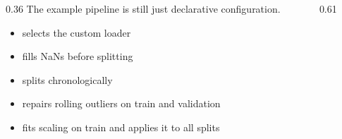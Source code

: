 \begin{frame}

  \vspace{14mm}
  \begin{columns}[T,onlytextwidth]
    \begin{column}{0.36\textwidth}
      {\small The example pipeline is still just declarative configuration.}\par
      \vspace{1.5mm}
      \begin{itemize}
        \item selects the custom loader
        \item fills NaNs before splitting
        \item splits chronologically
        \item repairs rolling outliers on train and validation
        \item fits scaling on train and applies it to all splits
      \end{itemize}
    \end{column}
    \begin{column}{0.61\textwidth}
      
    \end{column}
  \end{columns}

  \slideheaderfooter
\end{frame}

